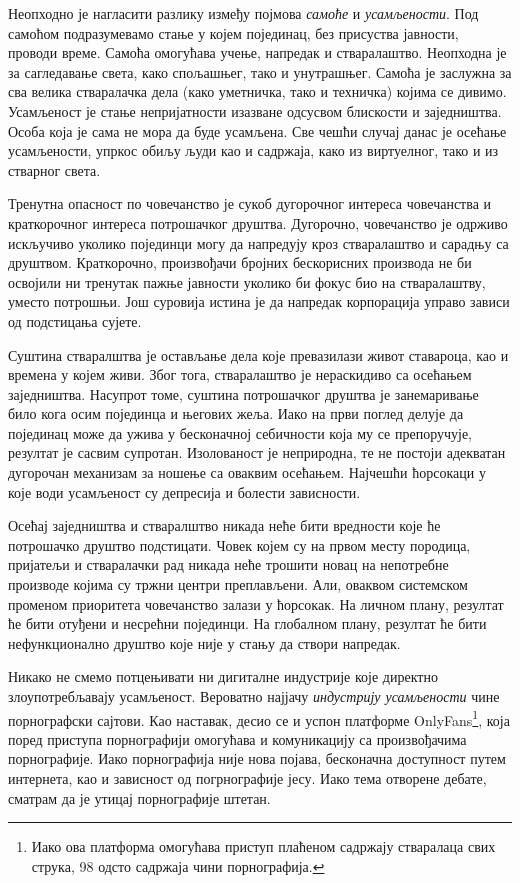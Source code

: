 \documentclass[b5paper]{article}
\begin{document}
Неопходно је нагласити разлику између појмова \textit{самоће} и \textit{усамљености}. Под самоћом подразумевамо стање у којем појединац, без присуства јавности, проводи време. Самоћа омогућава учење, напредак и стваралаштво. Неопходна је за сагледавање света, како спољашњег, тако и унутрашњег. Самоћа је заслужна за сва велика стваралачка дела (како уметничка, тако и техничка) којима се дивимо. Усамљеност је стање непријатности изазване одсусвом блискости и заједништва. Особа која је сама не мора да буде усамљена. Све чешћи случај данас је осећање усамљености, упркос обиљу људи као и садржаја, како из виртуелног, тако и из стварног света.

Тренутна опасност по човечанство је сукоб дугорочног интереса човечанства и краткорочног интереса потрошачког друштва. Дугорочно, човечанство је одрживо искључиво уколико појединци могу да напредују кроз стваралаштво и сарадњу са друштвом. Краткорочно, произвођачи бројних бескорисних производа не би освојили ни тренутак пажње јавности уколико би фокус био на стваралаштву, уместо потрошњи. Још суровија истина је да напредак корпорација управо зависи од подстицања сујете.

Суштина стваралштва је остављање дела које превазилази живот ставароца, као и времена у којем живи. Због тога, стваралаштво је нераскидиво са осећањем заједништва. Насупрот томе, суштина потрошачког друштва је занемаривање било кога осим појединца и његових жеља. Иако на први поглед делује да појединац може да ужива у бесконачној себичности која му се препоручује, резултат је сасвим супротан. Изолованост је неприродна, те не постоји адекватан дугорочан механизам за ношење са оваквим осећањем. Најчешћи ћорсокаци у које води усамљеност су депресија и болести зависности.

Осећај заједништва и стваралштво никада неће бити вредности које ће потрошачко друштво подстицати. Човек којем су на првом месту породица, пријатељи и стваралачки рад никада неће трошити новац на непотребне производе којима су тржни центри преплављени. Али, оваквом системском променом приоритета човечанство залази у ћорсокак. На личном плану, резултат ће бити отуђени и несрећни појединци. На глобалном плану, резултат ће бити нефункционално друштво које није у стању да створи напредак.

Никако не смемо потцењивати ни дигиталне индустрије које директно злоупотребљавају усамљеност. Вероватно најјачу \textit{индустрију усамљености} чине порнографски сајтови. Као наставак, десио се и успон платформе OnlyFans\footnote{Иако ова платформа омогућава приступ плаћеном садржају стваралаца свих струка, 98 одсто садржаја чини порнографија.}, која поред приступа порнографији омогућава и комуникацију са произвођачима порнографије. Иако порнографија није нова појава, бесконачна доступност путем интернета, као и зависност од погрнографије јесу. Иако тема отворене дебате, сматрам да је утицај порнографије штетан.
\end{document}
